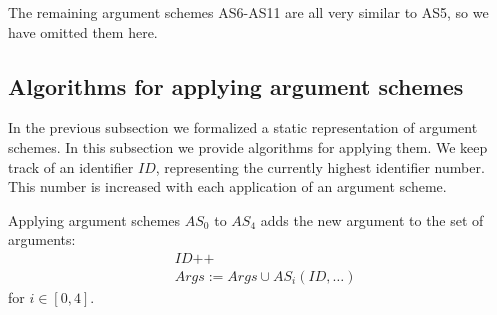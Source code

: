 The remaining argument schemes AS6-AS11 are all very similar to AS5, so we have omitted them here. 

\subsection{Algorithms for applying argument schemes}

In the previous subsection we formalized a static representation of argument schemes. In this subsection we provide algorithms for applying them. We keep track of an identifier $ID$, representing the currently highest identifier number. This number is increased with each application of an argument scheme.

\begin{definition}[Application of AS0-AS4] Applying argument schemes $AS_0$ to $AS_4$ adds the new argument to the set of arguments: 
\begin{align*}
&ID\text{++}\\
&Args := Args \cup AS_i(ID,\ldots)
\end{align*}
for $i\in[0,4]$.
\end{definition}